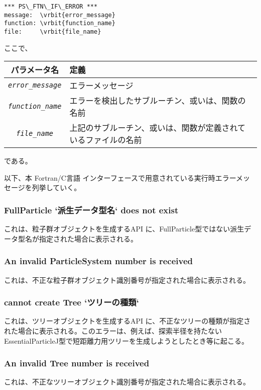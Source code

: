 \begin{screen}
\begin{Verbatim}[commandchars=\\\{\}]
*** PS\_FTN\_IF\_ERROR ***
message:  \vrbit{error_message}
function: \vrbit{function_name}
file:     \vrbit{file_name}
\end{Verbatim} 
\end{screen}
ここで、
\begin{table}[H]
\begin{tabularx}{\linewidth}{|c|X|}
\toprule
\rowcolor{Snow2}
パラメータ名 & 定義 \\
\midrule
\textit{\texttt{error\_message}} & エラーメッセージ \\
\textit{\texttt{function\_name}} & エラーを検出したサブルーチン、或いは、関数の名前 \\
\textit{\texttt{file\_name}}     & 上記のサブルーチン、或いは、関数が定義されているファイルの名前 \\
\bottomrule
\end{tabularx}
\end{table}
である。

以下、本 Fortran/C言語 インターフェースで用意されている実行時エラーメッセージを列挙していく。

\subsubsection{FullParticle `派生データ型名` does not exist}
これは、粒子群オブジェクトを生成するAPI  に、FullParticle型ではない派生データ型名が指定された場合に表示される。

\subsubsection{An invalid ParticleSystem number is received}
これは、不正な粒子群オブジェクト識別番号が指定された場合に表示される。

\subsubsection{cannot create Tree `ツリーの種類`}
これは、ツリーオブジェクトを生成するAPI  に、不正なツリーの種類が指定された場合に表示される。このエラーは、例えば、探索半径を持たないEssentialParticleJ型で短距離力用ツリーを生成しようとしたとき等に起こる。

\subsubsection{An invalid Tree number is received}
これは、不正なツリーオブジェクト識別番号が指定された場合に表示される。


